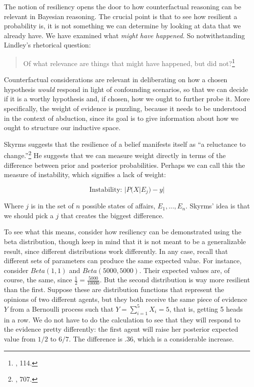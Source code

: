 The notion of resiliency opens the door to how counterfactual reasoning
can be relevant in Bayesian reasoning. The crucial point is that to see
how resilient a probability is, it is not something we can determine by
looking at data that we already have. We have examined what \emph{might
have happened}. So notwithstanding Lindley's rhetorical question:

\begin{quote}
Of what relevance are things that might have happened, but did
not?\footnote{\cite{lindleybern}, 114.}
\end{quote}

Counterfactual considerations are relevant in deliberating on how a
chosen hypothesis \emph{would} respond in light of confounding
scenarios, so that we can decide if it is a worthy hypothesis and, if
chosen, how we ought to further probe it. More specifically, the weight
of evidence is puzzling, because it needs to be understood in the
context of abduction, since its goal is to give information about how we
ought to structure our inductive space.

Skyrms suggests that the resilience of a belief manifests itself as ``a
reluctance to change.''\footnote{\cite{causationandconditional}, 707.} He suggests that we can measure weight
directly in terms of the difference between prior and posterior
probabilities. Perhaps we can call this the measure of instability,
which signifies a lack of weight:

\[\text{Instability: }|P(X|E_j) - y|\]

Where \(j\) is in the set of \(n\) possible states of affairs,
\(E_1,..., E_n\). Skyrms' idea is that we should pick a \(j\) that
creates the biggest difference.

To see what this means, consider how resiliency can be demonstrated
using the beta distribution, though keep in mind that it is not meant to
be a generalizable result, since different distributions work
differently. In any case, recall that different sets of parameters can
produce the same expected value. For instance, consider \(Beta(1,1)\)
and \(Beta(5000,5000)\). Their expected values are, of course, the same,
since \(\frac{1}{2} = \frac{5000}{10000}\). But the second distribution
is way more resilient than the first. Suppose these are distribution
functions that represent the opinions of two different agents, but they
both receive the same piece of evidence \(Y\) from a Bernoulli process
such that \(Y=\sum_{i=1}^5 X_i=5\), that is, getting 5 heads in a row.
We do not have to do the calculation to see that they will respond to
the evidence pretty differently: the first agent will raise her
posterior expected value from \(1/2\) to \(6/7\). The difference is
\(.36\), which is a considerable increase.

